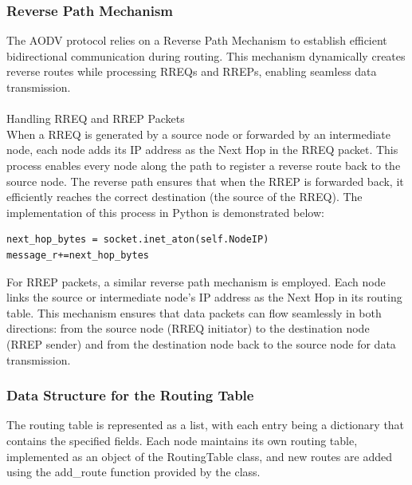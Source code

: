 \documentclass[]{nsm-thesis}
\begin{document}
\subsubsection{Reverse Path Mechanism}
The AODV protocol relies on a Reverse Path Mechanism to establish efficient bidirectional communication during routing. This mechanism dynamically creates reverse routes while processing RREQs and RREPs, enabling seamless data transmission.\\\\
{\large Handling RREQ and RREP Packets}
\\
When a RREQ is generated by a source node or forwarded by an intermediate node, each node adds its IP address as the Next Hop in the RREQ packet. This process enables every node along the path to register a reverse route back to the source node. The reverse path ensures that when the RREP is forwarded back, it efficiently reaches the correct destination (the source of the RREQ). The implementation of this process in Python is demonstrated below:

\lstset{
  basicstyle=\ttfamily\small,  %
  numbers=left,               %
  numberstyle=\tiny,          %
  stepnumber=1,               %
  numbersep=5pt,              %
  showstringspaces=false,     %
  frame=single,               %
  breaklines=true,            %
  captionpos=b,               %
  language=Python             %
}
\begin{lstlisting}[caption={Python code adding the Next Hop to an RREQ packet}, label={lst:example}]
next_hop_bytes = socket.inet_aton(self.NodeIP)
message_r+=next_hop_bytes
\end{lstlisting} 
For RREP packets, a similar reverse path mechanism is employed. Each node links the source or intermediate node's IP address as the Next Hop in its routing table. This mechanism ensures that data packets can flow seamlessly in both directions: from the source node (RREQ initiator) to the destination node (RREP sender) and from the destination node back to the source node for data transmission.
\subsubsection{Data Structure for the Routing Table}
The routing table is represented as a list, with each entry being a dictionary that contains the specified fields. Each node maintains its own routing table, implemented as an object of the RoutingTable class, and new routes are added using the add\_route function provided by the class.
\end{document}
